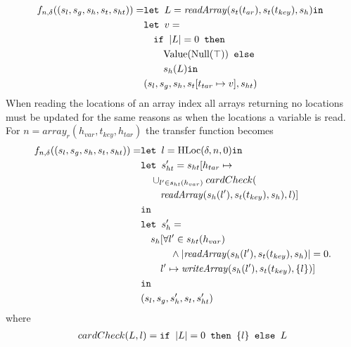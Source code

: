 \begin{align}
f_{n,\delta}((s_l, s_g, s_h, s_t, s_{ht})) =   &\texttt{let } L = \mathit{readArray}(s_t(t_{ar}), s_t(t_{key}) ,s_h) \texttt{in }\notag\\
                                    &\texttt{let } v = \notag\\
                                    &\quad\texttt{if }|L| = 0\texttt{ then } \notag\\
                                    &\quad\quad\text{Value}(\text{Null}(\top)) \texttt{ else } \notag\\
                                    &\quad\quad s_h(L) \texttt{in }\notag\\
                                    &  (s_l, s_g, s_h, s_t[t_{tar}\mapsto v], s_{ht})
\end{align}
When reading the locations of an array index all arrays returning no locations must be updated for the same reasons as when the locations a variable is read. For $n = \mathit{array}_r(h_{var},t_{key},h_{tar})$ the transfer function becomes
\begin{align}
f_{n,\delta}((s_l, s_g, s_h, s_t, s_{ht})) =   &\texttt{let } l = \text{HLoc}(\delta, n, 0) \texttt{in }\notag\\
                                    &\texttt{let } s_{ht}' = s_{ht}[h_{tar} \mapsto \notag\\
                                    & \quad \cup_{l'\in s_{ht}(h_{var})}cardCheck(\notag\\
                                    &\quad\quad \mathit{readArray}(s_h(l'), s_t(t_{key}), s_h), l)]\notag\\
                                    & \texttt{in }\notag\\
                                    &\texttt{let } s_h' = \notag\\
                                    &\quad s_h[\forall l' \in s_{ht}(h_{var}) \notag\\
                                    &\quad\quad\quad\wedge |\mathit{readArray}(s_h(l'), s_t(t_{key}), s_h)| = 0.\notag\\
                                    &\quad\quad l' \mapsto \mathit{writeArray}(s_h(l'), s_t(t_{key}), \{l\})]\notag\\
                                    & \texttt{in }\notag\\
                                    &(s_l, s_g, s_h', s_t, s_{ht}')
\end{align}
where 
\begin{align}
cardCheck(L, l) = \texttt{if }|L| = 0\texttt{ then } \{l\} \texttt{ else } L
\end{align}

